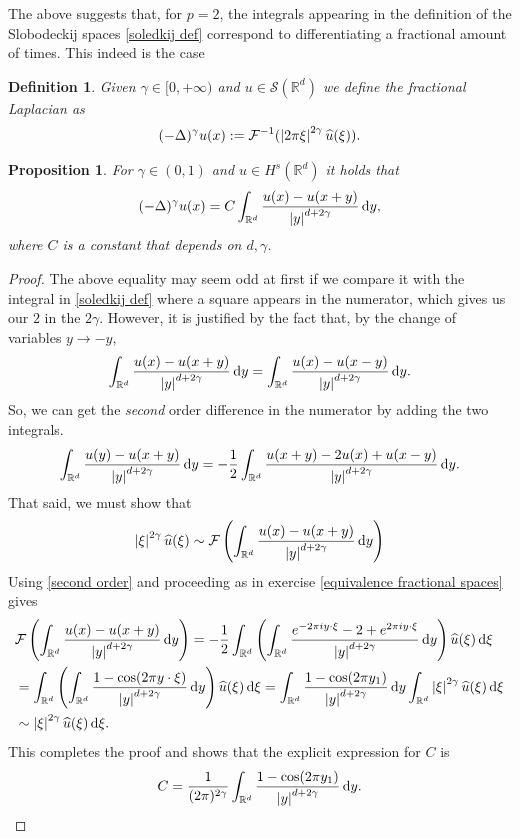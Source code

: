 \documentclass[
    a4paper,
    DIV=14,
    abstract=true,
    numbers=noenddot
]
{scrartcl}
\newtheorem{proposition}[theorem]{Proposition}
\newtheorem{definition}[theorem]{Definition}
\theoremstyle{definition}
\newcommand{\wh}[1]{\widehat{#1}}
\renewcommand{\d}{\,\mathrm{d}}\newcommand{\dx}{\,\mathrm{d}x}
\newcommand{\R}{\mathbb{R}}
\newcommand{\Ff}{\mathcal{F}}
\newcommand{\Ss}{\mathcal{S}}
\begin{document}
The above suggests that, for $p=2$, the integrals appearing in the definition of the Slobodeckij spaces \ref{soledkij def} correspond to differentiating a fractional amount of times. This indeed is the case
\begin{definition}
  Given $\gamma  \in [0,+\infty)$ and $u \in \Ss (\R^d)$ we define the fractional Laplacian as
  \begin{align*}
    (-\Delta )^{\gamma }u(x):= \mathcal{F}^{-1}(\abs{2\pi\xi}^{2\gamma }\wh{u}(\xi )).
  \end{align*}
\end{definition}
\begin{proposition}
  For $\gamma  \in (0,1)$ and $u \in H^{s}(\R^d)$ it holds that
  \begin{align*}
    (-\Delta )^{\gamma }u(x)=C\int_{\R^d}\frac{u(x)-u(x+y)}{\abs{y}^{d+2\gamma}}\d y,
  \end{align*}
  where $C$ is a constant that depends on $d,\gamma $.
\end{proposition}
\begin{proof}
  The above equality may seem odd at first if we compare it with the integral in \ref{soledkij def} where a square appears in the numerator, which gives us our $2$  in the $2 \gamma $. However, it is justified by the fact that, by the change of variables $y \to -y$,
  \begin{align*}
    \int_{\R^d}\frac{u(x)-u(x+y)}{\abs{y}^{d+2\gamma}}\d y=\int_{\R^d}\frac{u(x)-u(x-y)}{\abs{y}^{d+2\gamma}}\d y.
  \end{align*}
  So, we can get the \emph{second} order difference in the numerator by adding the two integrals.
  \begin{align}\label{second order}
    \int_{\R^d}\frac{u(y)-u(x+y)}{\abs{y}^{d+2\gamma}}\d y=-\frac{1}{2}\int_{\R^d}\frac{u(x+y)-2u(x)+u(x-y)}{\abs{y}^{d+2\gamma}}\d y.
  \end{align}
  That said, we must show that
  \begin{align*}
    \abs{\xi}^{2\gamma }\wh{u}(\xi )\sim \Ff \left(\int_{\R^d}\frac{u(x)-u(x+y)}{\abs{y}^{d+2\gamma}}\d y\right)
  \end{align*}
  Using \eqref{second order} and proceeding as in exercise \ref{equivalence fractional spaces} gives
  \begin{align*}
     & \Ff \left(\int_{\R^d}\frac{u(x)-u(x+y)}{\abs{y}^{d+2\gamma}}\d y\right)= -\frac{1}{2} \int_{\R^d}\left(\int_{\R^d}\frac{e^{-2\pi i y \cdot \xi}-2+e^{2\pi i y \cdot \xi}}{\abs{y}^{d+2\gamma}}\d y\right) \wh{u}(\xi)\d \xi       \\
     & =\int_{\R^d}\left(\int_{\R^d}\frac{1-\cos(2\pi y \cdot \xi)}{\abs{y}^{d+2\gamma}}\d y\right) \wh{u}(\xi)\d \xi =\int_{\R^d}  \frac{1-\cos(2\pi  y_1) }{\abs{y}^{d+2\gamma	}}\d y\int_{\R^d}\abs{\xi}^{2 \gamma }\wh{u}(\xi)\d \xi \\& \sim \abs{\xi}^{2 \gamma }\wh{u}(\xi)\d \xi.
  \end{align*}
  This completes the proof and shows that the explicit expression for $C$ is
  \begin{align*}
    C=\frac{1}{(2\pi)^{2 \gamma }}\int_{\R^d}  \frac{1-\cos(2\pi  y_1) }{\abs{y}^{d+2\gamma	}}\d y.
  \end{align*}
\end{proof}
\end{document}

